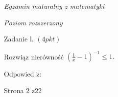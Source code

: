 \documentclass[a4paper,12pt]{article}
\begin{document}
{\it Egzamin maturalny z matematyki}

{\it Poziom rozszerzony}

Zadanie l. $(4pkt)$

Rozwiąz nierówność $(\displaystyle \frac{1}{x}-1)^{-1}\leq 1.$

Odpowied $\acute{\mathrm{z}}$:

Strona 2 z22
\end{document}

